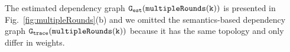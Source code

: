 The estimated dependency graph $\mathtt{{G_{est}}}(\mathtt{multipleRounds(k)})$ is presented in Fig.~\ref{fig:multipleRounds}(b) and we omitted the semantics-based dependency graph $\mathtt{{G_{trace}}}(\mathtt{multipleRounds(k)})$ because it has the same topology and only differ in weights.
%
